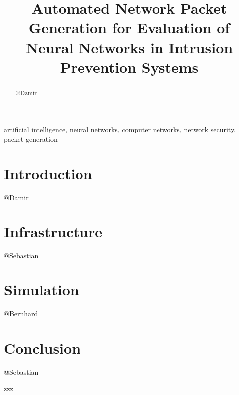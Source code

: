 \documentclass[conference]{IEEEtran}
\begin{document}
\title{Automated Network Packet Generation for Evaluation of Neural Networks in Intrusion Prevention Systems}

\author{
\and
{}
\and
{}
}

\maketitle

\begin{abstract}
@Damir
\end{abstract}

\begin{IEEEkeywords}
artificial intelligence, neural networks, computer networks, network security, packet generation
\end{IEEEkeywords}

\section{Introduction}
@Damir

\section{Infrastructure}
@Sebastian

\section{Simulation}
@Bernhard

\section{Conclusion}
@Sebastian

\begin{thebibliography}{00}
 zzz
\end{thebibliography}
\end{document}
